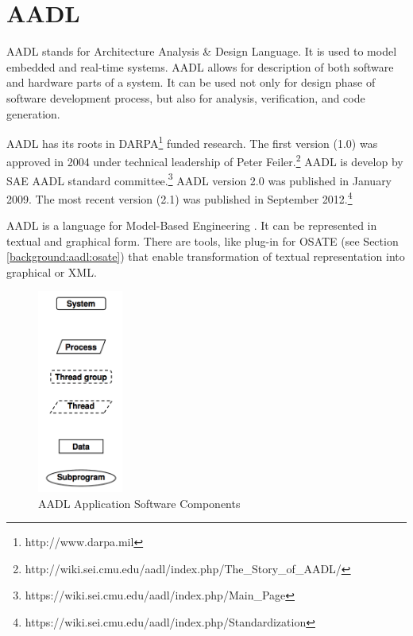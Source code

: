 \section{AADL}
\label{background:aadl}

AADL stands for Architecture Analysis \& Design Language. It is used to model embedded and real-time systems. AADL allows for description of both software and hardware parts of a system. It can be used not only for design phase of software development process, but also for analysis, verification, and code generation.

AADL has its roots in DARPA\footnote{http://www.darpa.mil} funded research. The first version (1.0) was approved in 2004 under technical leadership of Peter Feiler.\footnote{http://wiki.sei.cmu.edu/aadl/index.php/The\_Story\_of\_AADL/} AADL is develop by SAE AADL standard committee.\footnote{https://wiki.sei.cmu.edu/aadl/index.php/Main\_Page} AADL version 2.0 was published in January 2009. The most recent version (2.1) was published in September 2012.\footnote{https://wiki.sei.cmu.edu/aadl/index.php/Standardization}

AADL is a language for Model-Based Engineering \cite{AadlBook}. It can be represented in textual and graphical form. There are tools, like plug-in for OSATE (see Section \ref{background:aadl:osate}) that enable transformation of textual representation into graphical or XML. 

\begin{figure}
  \begin{center}
    \includegraphics[width=0.25\textwidth]{figures/aadl-app-components.png}
  \end{center}
  \caption{AADL Application Software Components}
  \label{figure:aadl_app_software_components}
\end{figure}

